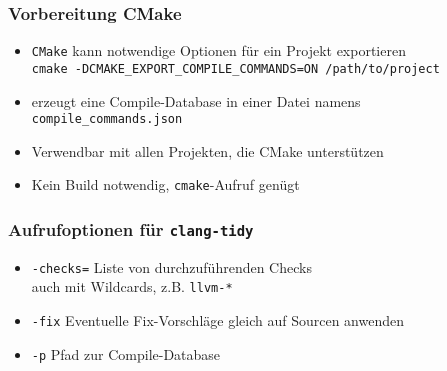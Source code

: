 \documentclass[aspectratio=169]{beamer}
\begin{document}
\begin{frame}
  \frametitle{Vorbereitung CMake}
  \begin{itemize}
  \item \texttt{CMake} kann notwendige Optionen für ein Projekt exportieren\\
    \pause \texttt{cmake -DCMAKE\_EXPORT\_COMPILE\_COMMANDS=ON /path/to/project}
    \pause
  \item erzeugt eine Compile-Database in einer Datei namens \texttt{compile\_commands.json}
  \item Verwendbar mit allen Projekten, die CMake unterstützen
  \item Kein Build notwendig, \texttt{cmake}-Aufruf genügt
  \end{itemize}
\end{frame}

\begin{frame}
  \frametitle{Aufrufoptionen für \texttt{clang-tidy}}
  \begin{itemize}
  \item \texttt{-checks=} Liste von durchzuführenden Checks\\
    \qquad auch mit Wildcards, z.B. \texttt{llvm-*}
  \item \texttt{-fix} Eventuelle Fix-Vorschläge gleich auf Sourcen anwenden
  \item \texttt{-p} Pfad zur Compile-Database
  \end{itemize}
\end{frame}
\end{document}
